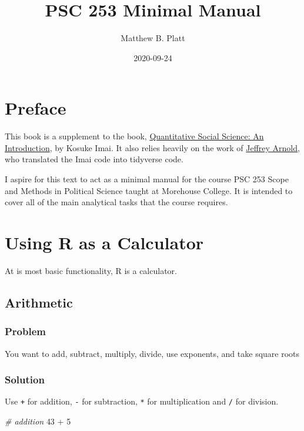 \documentclass[]{book}
\title{PSC 253 Minimal Manual}
\author{Matthew B. Platt}
\date{2020-09-24}
\newenvironment{Shaded}{\begin{snugshade}}{\end{snugshade}}
\newcommand{\DecValTok}[1]{\textcolor[rgb]{0.00,0.00,0.81}{{#1}}}
\newcommand{\StringTok}[1]{\textcolor[rgb]{0.31,0.60,0.02}{{#1}}}
\newcommand{\CommentTok}[1]{\textcolor[rgb]{0.56,0.35,0.01}{\textit{{#1}}}}
\newcommand{\NormalTok}[1]{{#1}}
\begin{document}
\maketitle

{
\setcounter{tocdepth}{1}
\tableofcontents
}
\chapter*{Preface}\label{preface}

This book is a supplement to the book,
\href{http://qss.princeton.press/}{Quantitative Social Science: An
Introduction}, by Kosuke Imai. It also relies heavily on the work of
\href{https://jrnold.github.io/qss-tidy/}{Jeffrey Arnold}, who
translated the Imai code into tidyverse code.

I aspire for this text to act as a minimal manual for the course PSC 253
Scope and Methods in Political Science taught at Morehouse College. It
is intended to cover all of the main analytical tasks that the course
requires.

\chapter{Using R as a Calculator}\label{calculate}

At is most basic functionality, R is a calculator.

\section{Arithmetic}\label{arithmetic}

\subsection{Problem}\label{problem}

You want to add, subtract, multiply, divide, use exponents, and take
square roots

\subsection{Solution}\label{solution}

Use \texttt{+} for addition, \texttt{-} for subtraction, \texttt{*} for
multiplication and \texttt{/} for division.

\begin{Shaded}
\begin{Highlighting}[]
\CommentTok{# addition}
\DecValTok{43} \NormalTok{+}\StringTok{ }\DecValTok{5}
\end{Highlighting}
\end{Shaded}
\end{document}
